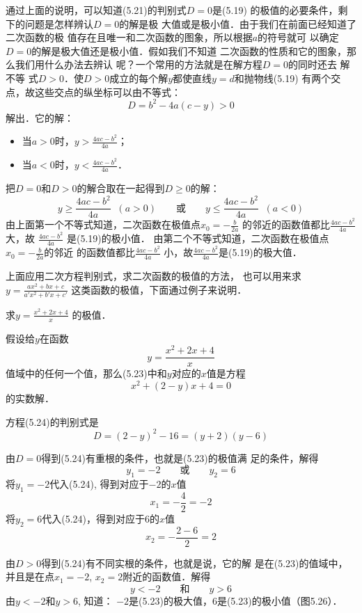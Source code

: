 通过上面的说明，可以知道(5.21)的判别式$D=0$是(5.19)
的极值的必要条件，剩下的问题是怎样辨认$D=0$的解是极
大值或是极小值．由于我们在前面已经知道了二次函数的极
值存在且唯一和二次函数的图象，所以根据$a$的符号就可
以确定$D=0$的解是极大值还是极小值．假如我们不知道
二次函数的性质和它的图象，那么我们用什么办法去辨认
呢？一个常用的方法就是在解方程$D=0$的同时还去 解不等
式$D>0$．使$D>0$成立的每个解$y$都使直线$y=d$和抛物线(5.19)
有两个交点，故这些交点的纵坐标可以由不等式：
\[D=b^2-4a(c-y)>0\]
解出．它的解：
\begin{itemize}
    \item 当$a>0$时，$y>\frac{4ac-b^2}{4a}$；
    \item 当$a<0$时，$y<\frac{4ac-b^2}{4a}$．
\end{itemize}

把$D=0$和$D>0$的解合取在一起得到$D\ge 0$的解：
\[y\ge \frac{4ac-b^2}{4a}\;\; (a>0)\qquad \text{或}\qquad y\le \frac{4ac-b^2}{4a}\;\; (a<0)\]
由上面第一个不等式知道，二次函数在极值点$x_0=-\frac{b}{2a}$
的邻近的函数值都比$\frac{4ac-b^2}{4a}$大，故
$\frac{4ac-b^2}{4a}$
是(5.19)的极小值．
由第二个不等式知道，二次函数在极值点$x_0=-\frac{b}{2a}$的邻近
的函数值都比$\frac{4ac-b^2}{4a}$
小，故$\frac{4ac-b^2}{4a}$是(5.19)的极大值．

上面应用二次方程判别式，求二次函数的极值的方法，
也可以用来求$y=\frac{ax^2+bx+c}{a'x^2+b'x+c'}$
这类函数的极值，下面通过例子来说明．





\begin{example}
    求$y=\frac{x^2+2x+4}{x}$
的极值．
\end{example}

\begin{solution}
    假设给$y$在函数
    \begin{equation}
        y=\frac{x^2+2x+4}{x}
    \end{equation}
    值域中的任何一个值，那么(5.23)中和$y$对应的$x$值是方程
    \begin{equation}
        x^2+(2-y)x+4=0
    \end{equation}
    的实数解．

    方程(5.24)的判别式是
    \begin{equation}
        D=(2-y)^2-16=(y+2)(y-6)
    \end{equation}

    由$D=0$得到(5.24)有重根的条件，也就是(5.23)的极值满
    足的条件，解得
 \[   y_1=-2\qquad \text{或}\qquad y_2=6\]
    将$y_1=-2$代入(5.24), 得到对应于$-2$的$x$值
  \[  x_1=-\frac{4}{2}=-2\]
    将$y_2=6$代入(5.24)，得到对应于6的$x$值
    \[x_2=-\frac{2-6}{2}=2\]

    由$D>0$得到(5.24)有不同实根的条件，也就是说，它的解
    是在(5.23)的值域中，并且是在点$x_1=-2$, $x_2=2$附近的函数值．解得
  \[  y<-2\qquad \text{和}\qquad y>6\]
    由$y<-2$和$y>6$, 知道：
    $-2$是(5.23)的极大值，6是(5.23)的极小值（图5.26）．
\end{solution}


